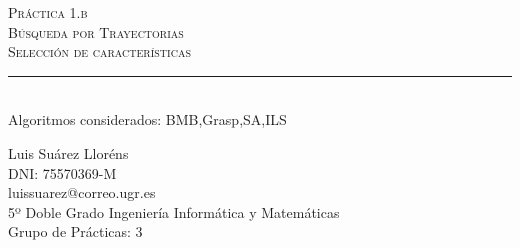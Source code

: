 \begin{titlepage}

\newcommand{\HRule}{\rule{\linewidth}{0.5mm}} %

\center %
 

\textsc{\LARGE Práctica 1.b}\\[1.0cm] %
\textsc{\Large Búsqueda por Trayectorias}\\[0.5cm] %
\textsc{\large Selección de características}\\[0.5cm] %


\HRule \\[0.4cm]
{Algoritmos considerados: BMB,Grasp,SA,ILS}\\[0.4cm] %

 

\begin{minipage}{1\textwidth}
\begin{flushleft} \large
Luis Suárez Lloréns\\
DNI: 75570369-M\\
luissuarez@correo.ugr.es\\
5º Doble Grado Ingeniería Informática y Matemáticas\\
Grupo de Prácticas: 3
\end{flushleft}
\end{minipage}




\end{titlepage}
